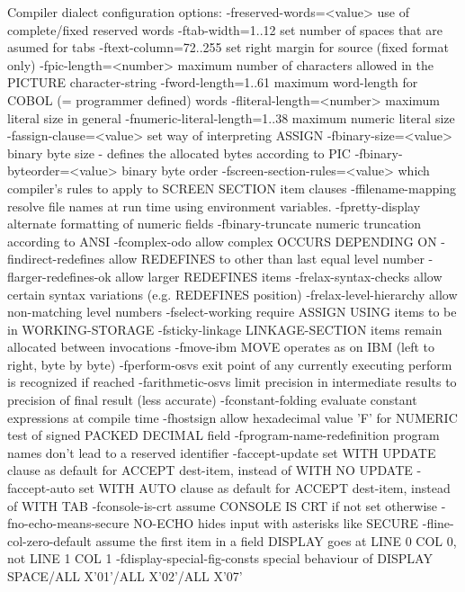 Compiler dialect configuration options:
  -freserved-words=<value>	use of complete/fixed reserved words
  -ftab-width=1..12      set number of spaces that are asumed for tabs
  -ftext-column=72..255  set right margin for source (fixed format only)
  -fpic-length=<number>  maximum number of characters allowed in the PICTURE character-string
  -fword-length=1..61    maximum word-length for COBOL (= programmer defined) words
  -fliteral-length=<number>	maximum literal size in general
  -fnumeric-literal-length=1..38	maximum numeric literal size
  -fassign-clause=<value>	set way of interpreting ASSIGN
  -fbinary-size=<value>  binary byte size - defines the allocated bytes according to PIC
  -fbinary-byteorder=<value>	binary byte order
  -fscreen-section-rules=<value>	which compiler's rules to apply to SCREEN SECTION item clauses
  -ffilename-mapping     resolve file names at run time using environment variables.
  -fpretty-display       alternate formatting of numeric fields
  -fbinary-truncate      numeric truncation according to ANSI
  -fcomplex-odo          allow complex OCCURS DEPENDING ON
  -findirect-redefines   allow REDEFINES to other than last equal level number
  -flarger-redefines-ok  allow larger REDEFINES items
  -frelax-syntax-checks  allow certain syntax variations (e.g. REDEFINES position)
  -frelax-level-hierarchy	allow non-matching level numbers
  -fselect-working       require ASSIGN USING items to be in WORKING-STORAGE
  -fsticky-linkage       LINKAGE-SECTION items remain allocated between invocations
  -fmove-ibm             MOVE operates as on IBM (left to right, byte by byte)
  -fperform-osvs         exit point of any currently executing perform is recognized if reached
  -farithmetic-osvs      limit precision in intermediate results to precision of final result (less accurate)
  -fconstant-folding     evaluate constant expressions at compile time
  -fhostsign             allow hexadecimal value 'F' for NUMERIC test of signed PACKED DECIMAL field
  -fprogram-name-redefinition	program names don't lead to a reserved identifier
  -faccept-update        set WITH UPDATE clause as default for ACCEPT dest-item, instead of WITH NO UPDATE
  -faccept-auto          set WITH AUTO clause as default for ACCEPT dest-item, instead of WITH TAB
  -fconsole-is-crt       assume CONSOLE IS CRT if not set otherwise
  -fno-echo-means-secure	NO-ECHO hides input with asterisks like SECURE
  -fline-col-zero-default	assume the first item in a field DISPLAY goes at LINE 0 COL 0, not LINE 1 COL 1
  -fdisplay-special-fig-consts	special behaviour of DISPLAY SPACE/ALL X'01'/ALL X'02'/ALL X'07'
